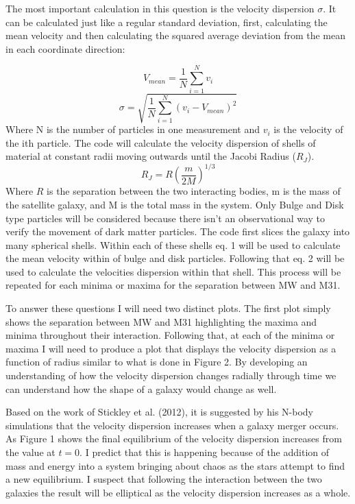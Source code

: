 \documentclass[fleqn,usenatbib]{mnras}
\begin{document}
The most important calculation in this question is the velocity dispersion $\sigma$. It can be calculated just like a regular standard deviation, first, calculating the mean velocity and then calculating the squared average deviation from the mean in each coordinate direction:

\begin{equation}
V_{mean} = \frac{1}{N}\sum_{i=1}^Nv_i
\end{equation}
\begin{equation}
\sigma = \sqrt{\frac{1}{N}\sum_{i=1}^N(v_i-V_{mean})^2}
\end{equation}
Where N is the number of particles in one measurement and $v_i$ is the velocity of the ith particle. 
The code will calculate the velocity dispersion of shells of material at constant radii moving outwards until the Jacobi Radius ($R_J$). \cite{1962AJ.....67..471K}
\begin{equation}
    R_J = R(\frac{m}{2M})^{1/3}
\end{equation}
Where $R$ is the separation between the two interacting bodies, m is the mass of the satellite galaxy, and M is the total mass in the system. Only Bulge and Disk type particles will be considered because there isn't an observational way to verify the movement of dark matter particles. The code first slices the galaxy into many spherical shells. Within each of these shells eq. 1 will be used to calculate the mean velocity within of bulge and disk particles. Following that eq. 2 will be used to calculate the velocities dispersion within that shell. This process will be repeated for each minima or maxima for the separation between MW and M31. 


To answer these questions I will need two distinct plots. The first plot simply shows the separation between MW and M31 highlighting the maxima and minima throughout their interaction. Following that, at each of the minima or maxima I will need to produce a plot that displays the velocity dispersion as a function of radius similar to what is done in Figure 2. \cite{refId0} By developing an understanding of how the velocity dispersion changes radially through time we can understand how the shape of a galaxy would change as well. 


Based on the work of Stickley et al. (2012), it is suggested by his N-body simulations that the velocity dispersion increases when a galaxy merger occurs. As Figure 1 shows the final equilibrium of the velocity dispersion increases from the value at $t=0$. I predict that this is happening because of the addition of mass and energy into a system bringing about chaos as the stars attempt to find a new equilibrium. I suspect that following the interaction between the two galaxies the result will be elliptical as the velocity dispersion increases as a whole.
\end{document}
